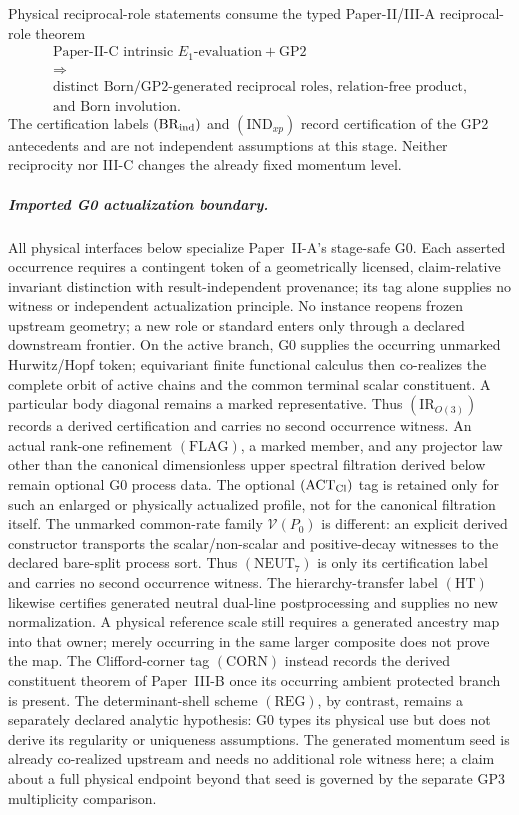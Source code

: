 \documentclass[12pt,a4paper]{article}
\begin{document}
Physical reciprocal-role statements consume the typed Paper-II/III-A
reciprocal-role theorem
\[
 \begin{gathered}
  \text{Paper-II-C intrinsic }E_1\text{-evaluation}+\mathrm{GP2}
  \\[2pt]
  \Longrightarrow
  \\[2pt]
  \text{distinct Born/GP2-generated reciprocal roles, relation-free product,}
  \\
  \text{and Born involution}.
 \end{gathered}
\]
The certification labels \( (\mathrm{BR}_{\rm ind}) \) and
\( (\mathrm{IND}_{xp}) \) record certification of the GP2 antecedents and
are not independent assumptions at this stage.  Neither reciprocity nor III-C
changes the already fixed momentum level.

\subparagraph{Imported G0 actualization boundary.}
All physical interfaces below specialize Paper~II-A's stage-safe G0.  Each
asserted occurrence requires a contingent token of a geometrically licensed,
claim-relative invariant distinction with result-independent provenance; its
tag alone supplies no witness or independent actualization principle.  No
instance reopens frozen upstream geometry; a new role or standard enters only
through a declared downstream frontier.  On the active branch, G0 supplies
the occurring unmarked Hurwitz/Hopf token; equivariant finite functional
calculus then co-realizes the complete orbit of active chains and the common
terminal scalar constituent.  A particular body diagonal remains a marked
representative.  Thus
\((\mathrm{IR}_{O(3)})\) records a derived certification and carries no
second occurrence witness.  An actual rank-one refinement
\((\mathrm{FLAG})\), a marked member, and any projector law other than the
canonical dimensionless upper spectral filtration derived below remain
optional G0 process data.  The optional
\((\mathrm{ACT}_{\rm Cl})\) tag is retained only for such an enlarged or
physically actualized profile, not for the canonical filtration itself.  The
unmarked common-rate family \(\mathcal V(P_0)\) is different: an explicit
derived constructor transports the scalar/non-scalar and positive-decay
witnesses to the declared bare-split process sort.  Thus
\((\mathrm{NEUT}_7)\) is only its certification label and carries no second
occurrence witness.  The hierarchy-transfer label \((\mathrm{HT})\)
likewise certifies generated neutral dual-line postprocessing and supplies no
new normalization.  A physical reference scale still requires a generated
ancestry map into that owner; merely occurring in the same larger composite
does not prove the map.  The Clifford-corner tag
\((\mathrm{CORN})\)
instead records the derived constituent theorem of Paper~III-B once its
occurring ambient protected branch is present.  The
determinant-shell scheme \((\mathrm{REG})\), by contrast, remains a separately
declared analytic hypothesis: G0 types its physical use but does not derive
its regularity or uniqueness assumptions.  The generated momentum seed is already co-realized upstream and needs no
additional role witness here; a claim about a full physical endpoint beyond
that seed is governed by the separate GP3 multiplicity comparison.
\end{document}
